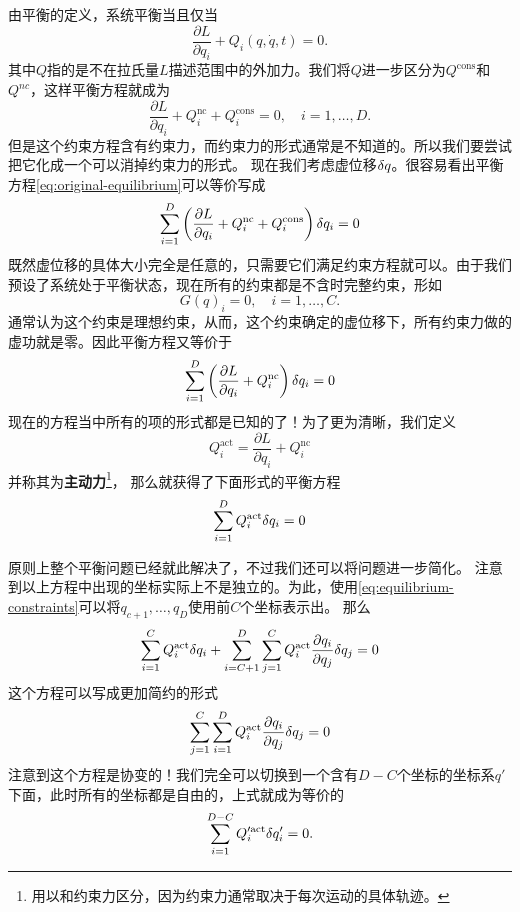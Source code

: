 \documentclass[UTF8, a4paper]{ctexart}
\begin{document}
由平衡的定义，系统平衡当且仅当
\[
    \frac{\partial L}{\partial q_i} + Q_i(q, \dot{q}, t) = 0.
\]
其中$Q$指的是不在拉氏量$L$描述范围中的外加力。我们将$Q$进一步区分为$Q^{\text{cons}}$和$Q^{nc}$，这样平衡方程就成为
\begin{equation}
    \frac{\partial L}{\partial q_i} + Q^{\text{nc}}_i + Q^{\text{cons}}_i = 0, \quad i = 1, \ldots, D.
    \label{eq:original-equilibrium}
\end{equation}
但是这个约束方程含有约束力，而约束力的形式通常是不知道的。所以我们要尝试把它化成一个可以消掉约束力的形式。
现在我们考虑虚位移$\var q$。很容易看出平衡方程\eqref{eq:original-equilibrium}可以等价写成
\[
    \sum_{i=1}^D \left(\frac{\partial L}{\partial q_i} + Q^{\text{nc}}_i + Q^{\text{cons}}_i\right) \var q_i = 0 
\]
既然虚位移的具体大小完全是任意的，只需要它们满足约束方程就可以。由于我们预设了系统处于平衡状态，现在所有的约束都是不含时完整约束，形如
\begin{equation}
    G(q)_i = 0, \quad i = 1, \ldots, C.
    \label{eq:equilibrium-constraints}
\end{equation}
通常认为这个约束是理想约束，从而，这个约束确定的虚位移下，所有约束力做的虚功就是零。因此平衡方程又等价于
\[
    \sum_{i=1}^D \left(\frac{\partial L}{\partial q_i} + Q^{\text{nc}}_i\right) \var q_i = 0 
\]
现在的方程当中所有的项的形式都是已知的了！为了更为清晰，我们定义
\begin{equation}
    Q^{\text{act}}_i = \frac{\partial L}{\partial q_i} + Q^{\text{nc}}_i
    \label{eq:active-force}
\end{equation}
并称其为\textbf{主动力}\footnote{用以和约束力区分，因为约束力通常取决于每次运动的具体轨迹。}，
那么就获得了下面形式的平衡方程
\begin{equation}
    \sum_{i=1}^D Q^{\text{act}}_i \var q_i = 0
\end{equation}

原则上整个平衡问题已经就此解决了，不过我们还可以将问题进一步简化。
注意到以上方程中出现的坐标实际上不是独立的。为此，使用\eqref{eq:equilibrium-constraints}可以将$q_{c+1}, \ldots, q_{D}$使用前$C$个坐标表示出。
那么
\begin{equation}
    \sum_{i=1}^C Q^{\text{act}}_i \var q_i 
    + \sum_{i=C+1}^{D} \sum_{j=1}^C Q^{\text{act}}_i \frac{\partial q_i}{\partial q_j} \var q_j = 0
\end{equation}
这个方程可以写成更加简约的形式
\[
    \sum_{j=1}^C \sum_{i=1}^{D} Q^{\text{act}}_i \frac{\partial q_i}{\partial q_j} \var q_j = 0
\]
注意到这个方程是协变的！我们完全可以切换到一个含有$D-C$个坐标的坐标系$q'$下面，此时所有的坐标都是自由的，上式就成为等价的
\begin{equation}
    \sum_{i=1}^{D-C} Q'^{\text{act}}_i \var q'_i = 0.
\end{equation}
\end{document}
